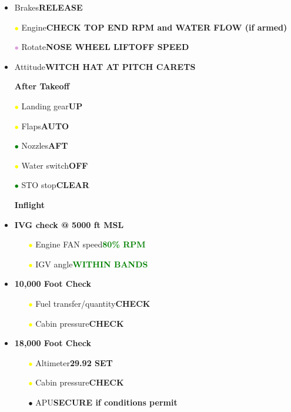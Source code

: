 \documentclass[a4paper,12pt,dvipsnames]{letter}
\newcommand{\button}[1]{\textbf{#1}}
\newcommand{\ok}[1]{\textcolor{Green}{\textbf{#1}}}
\newcommand{\bi}{\textcolor{ProcessBlue}{$\bullet$\;}}
\newcommand{\gi}{\textcolor{Green}{$\bullet$\;}}
\newcommand{\yi}{\textcolor{Yellow}{$\bullet$\;}}
\newcommand{\vi}{\textcolor{Plum}{$\bullet$\;}}
\begin{document}
{\begin{itemize}
\item Brakes\dotfill\button{RELEASE}
\item[\yi] Engine\dotfill\button{CHECK TOP END RPM and WATER FLOW (if armed)}
\item[\vi] Rotate\dotfill\button{NOSE WHEEL LIFTOFF SPEED}
\item Attitude\dotfill\button{WITCH HAT AT PITCH CARETS}
\end{itemize}
\newpage
\begin{itemize}
\item[] {\LARGE\textbf{After Takeoff}}
\item[\yi] Landing gear\dotfill\button{UP}
\item[\yi] Flaps\dotfill\button{AUTO}
\item[\gi] Nozzles\dotfill\button{AFT}
\item[\yi] Water switch\dotfill\button{OFF}
\item[\gi] STO stop\dotfill\button{CLEAR}
\end{itemize}
\vspace{1em}
\begin{itemize}
\item[] {\LARGE\textbf{Inflight}}
\item \button{IVG check @ 5000 ft MSL}
\begin{itemize}
 \item[\yi] Engine FAN speed\dotfill\ok{80\% RPM}
 \item[\yi] IGV angle\dotfill\ok{WITHIN BANDS}
\end{itemize}
\item \button{10,000 Foot Check}
\begin{itemize}
 \item[\yi] Fuel transfer/quantity\dotfill\button{CHECK}
 \item[\yi] Cabin pressure\dotfill\button{CHECK}
\end{itemize}
\item \button{18,000 Foot Check}
\begin{itemize}
 \item[\yi] Altimeter\dotfill\button{29.92 SET}
 \item[\yi] Cabin pressure\dotfill\button{CHECK}
 \item[\bi] APU\dotfill\button{SECURE if conditions permit}

\end{itemize}
\end{itemize}}
\end{document}

